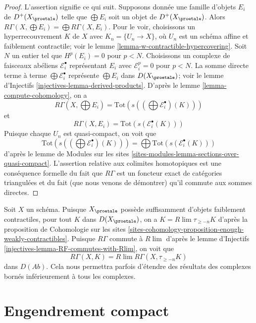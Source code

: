 \begin{proof}
L'assertion signifie ce qui suit. Supposons donnée une famille d'objets
$E_i$ de $D^+(X_\proetale)$ telle que $\bigoplus E_i$ soit un objet
de $D^+(X_\proetale)$. Alors
$R\Gamma(X, \bigoplus E_i) = \bigoplus R\Gamma(X, E_i)$.
Pour le voir, choisissons un hyperrecouvrement $K$ de $X$ avec $K_n = \{U_n \to X\}$,
où $U_n$ est un schéma affine et faiblement contractile; voir le
lemme \ref{lemma-w-contractible-hypercovering}.
Soit $N$ un entier tel que $H^p(E_i) = 0$ pour $p < N$.
Choisissons un complexe de faisceaux abéliens $\mathcal{E}_i^\bullet$
représentant $E_i$ avec $\mathcal{E}_i^p = 0$ pour $p < N$.
La somme directe terme à terme $\bigoplus \mathcal{E}_i^\bullet$ représente
$\bigoplus E_i$ dans $D(X_\proetale)$; voir le
lemme d'Injectifs \ref{injectives-lemma-derived-products}.
D'après le lemme \ref{lemma-compute-cohomology}, on a
$$
R\Gamma(X, \bigoplus E_i) =
\text{Tot}(s((\bigoplus \mathcal{E}^\bullet_i)(K)))
$$
et
$$
R\Gamma(X, E_i) = \text{Tot}(s(\mathcal{E}^\bullet_i(K)))
$$
Puisque chaque $U_n$ est quasi-compact, on voit que
$$
\text{Tot}(s((\bigoplus \mathcal{E}^\bullet_i)(K))) =
\bigoplus \text{Tot}(s(\mathcal{E}^\bullet_i(K)))
$$
d'après le lemme de Modules sur les sites
\ref{sites-modules-lemma-sections-over-quasi-compact}.
L'assertion relative aux colimites homotopiques est une conséquence formelle du fait
que $R\Gamma$ est un foncteur exact de catégories triangulées et du
fait (que nous venons de démontrer) qu'il commute aux sommes directes.
\end{proof}

\begin{remark}
\label{remark-extend-to-all}
Soit $X$ un schéma. Puisque $X_\proetale$ possède suffisamment d'objets faiblement contractiles,
pour tout $K$ dans $D(X_\proetale)$, on a $K = R\lim \tau_{\geq -n}K$
d'après la
proposition de Cohomologie sur les sites
\ref{sites-cohomology-proposition-enough-weakly-contractibles}.
Puisque $R\Gamma$ commute à $R\lim$ d'après le
lemme d'Injectifs \ref{injectives-lemma-RF-commutes-with-Rlim},
on voit que
$$
R\Gamma(X, K) = R\lim R\Gamma(X, \tau_{\geq -n}K)
$$
dans $D(\textit{Ab})$. Cela nous permettra parfois d'étendre des résultats des
complexes bornés inférieurement à tous les complexes.
\end{remark}







\section{Engendrement compact}
\label{section-compact-generation}

